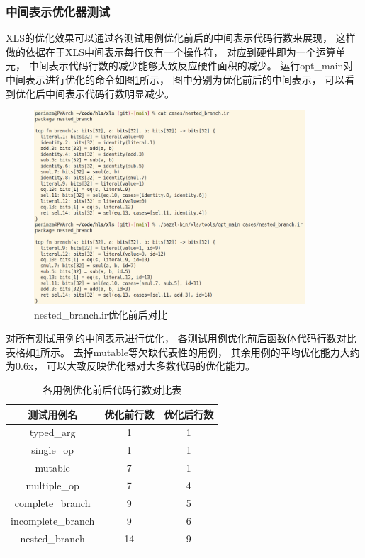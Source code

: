 \subsubsection{中间表示优化器测试}

XLS的优化效果可以通过各测试用例优化前后的中间表示代码行数来展现，
这样做的依据在于XLS中间表示每行仅有一个操作符，
对应到硬件即为一个运算单元，
中间表示代码行数的减少能够大致反应硬件面积的减少。
运行opt\_main对中间表示进行优化的命令如图\ref{fig.7}所示，
图中分别为优化前后的中间表示，
可以看到优化后中间表示代码行数明显减少。

\begin{figure}[h]
\centering
\includegraphics[width=0.9\textwidth]{figure/opt_command.png}
\caption{nested\_branch.ir优化前后对比}
\label{fig.7}
\end{figure}

对所有测试用例的中间表示进行优化，
各测试用例优化前后函数体代码行数对比表格如\ref{table.7}所示。
去掉mutable等欠缺代表性的用例，
其余用例的平均优化能力大约为0.6x，
可以大致反映优化器对大多数代码的优化能力。

\begin{table}[ht]
\begin{center}
\caption{各用例优化前后代码行数对比表}

\begin{tabular}{ c c c }
    \Xhline{3\arrayrulewidth}
    测试用例名             & 优化前行数 & 优化后行数\\
    \hline
    typed\_arg            & 1  & 1 \\
    single\_op            & 1  & 1 \\
    mutable               & 7  & 1 \\
    multiple\_op          & 7  & 4 \\
    complete\_branch      & 9  & 5 \\
    incomplete\_branch    & 9  & 6 \\
    nested\_branch        & 14 & 9 \\
    \Xhline{3\arrayrulewidth}
\end{tabular}

\label{table.7}
\end{center}
\end{table}

